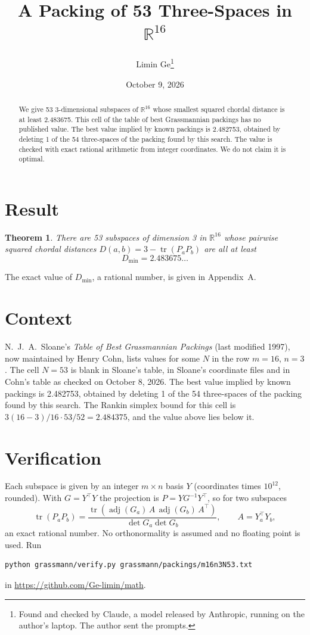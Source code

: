 \documentclass[11pt,a4paper]{article}
\title{A Packing of 53 Three-Spaces in $\mathbb{R}^{16}$}
\author{Limin Ge\thanks{Found and checked by Claude, a model released by Anthropic, running on the author's laptop. The author sent the prompts.}}
\date{October 9, 2026}
\newtheorem*{theorem}{Theorem}
\begin{document}
\maketitle
\begin{abstract}
We give 53 3-dimensional subspaces of $\mathbb{R}^{16}$ whose smallest squared chordal distance is at least 2.483675. This cell of the table of best Grassmannian packings has no published value. The best value implied by known packings is 2.482753, obtained by deleting 1 of the 54 three-spaces of the packing found by this search. The value is checked with exact rational arithmetic from integer coordinates. We do not claim it is optimal.
\end{abstract}

\section{Result}
\begin{theorem}
There are 53 subspaces of dimension 3 in $\mathbb{R}^{16}$ whose pairwise squared chordal distances $D(a,b) = 3 - \operatorname{tr}(P_aP_b)$ are all at least
\[ D_{\min} = 2.483675\ldots \]
\end{theorem}
The exact value of $D_{\min}$, a rational number, is given in Appendix~A.


\section{Context}
N.~J.~A.~Sloane's \emph{Table of Best Grassmannian Packings} (last modified 1997), now maintained by Henry Cohn, lists values for some $N$ in the row $m=16$, $n=3$. The cell $N=53$ is blank in Sloane's table, in Sloane's coordinate files and in Cohn's table as checked on October 8, 2026. The best value implied by known packings is 2.482753, obtained by deleting 1 of the 54 three-spaces of the packing found by this search. The Rankin simplex bound for this cell is $3(16-3)/16\cdot 53/52 = 2.484375$, and the value above lies below it.


\section{Verification}
Each subspace is given by an integer $m\times n$ basis $Y$ (coordinates times $10^{12}$, rounded). With $G=Y^\top Y$ the projection is $P=YG^{-1}Y^\top$, so for two subspaces
\[ \operatorname{tr}(P_aP_b)=\frac{\operatorname{tr}(\operatorname{adj}(G_a)\,A\,\operatorname{adj}(G_b)\,A^\top)}{\det G_a\det G_b},\qquad A=Y_a^\top Y_b, \]
an exact rational number. No orthonormality is assumed and no floating point is used. Run
\begin{verbatim}
python grassmann/verify.py grassmann/packings/m16n3N53.txt
\end{verbatim}
in \url{https://github.com/Ge-limin/math}.
\end{document}
